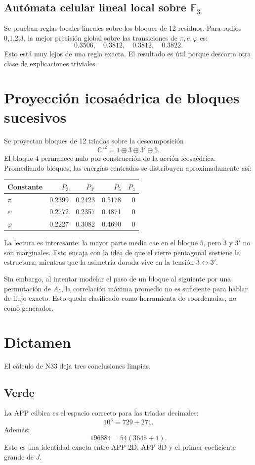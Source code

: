 \documentclass[11pt,a4paper]{article}
\begin{document}
\subsection{Autómata celular lineal local sobre \(\mathbb F_3\)}
Se prueban reglas locales lineales sobre los bloques de 12 residuos. Para radios 0,1,2,3, la mejor precisión global sobre las transiciones de \(\pi,e,\varphi\) es:
\[
0.3506,
\quad
0.3812,
\quad
0.3812,
\quad
0.3822.
\]
Esto está muy lejos de una regla exacta. El resultado es útil porque descarta otra clase de explicaciones triviales.

\section{Proyección icosaédrica de bloques sucesivos}
Se proyectan bloques de 12 triadas sobre la descomposición
\[
\mathbb C^{12}=1\oplus3\oplus3'\oplus5.
\]
El bloque \(4\) permanece nulo por construcción de la acción icosaédrica. Promediando bloques, las energías centradas se distribuyen aproximadamente así:

\begin{longtable}{lrrrr}
\toprule
Constante & \(P_3\) & \(P_{3'}\) & \(P_5\) & \(P_4\)\\
\midrule
\(\pi\) & 0.2399 & 0.2423 & 0.5178 & 0\\
\(e\) & 0.2772 & 0.2357 & 0.4871 & 0\\
\(\varphi\) & 0.2227 & 0.3082 & 0.4690 & 0\\
\bottomrule
\end{longtable}

La lectura es interesante: la mayor parte media cae en el bloque \(5\), pero \(3\) y \(3'\) no son marginales. Esto encaja con la idea de que el cierre pentagonal sostiene la estructura, mientras que la asimetría dorada vive en la tensión \(3\leftrightarrow3'\).

Sin embargo, al intentar modelar el paso de un bloque al siguiente por una permutación de \(A_5\), la correlación máxima promedio no es suficiente para hablar de flujo exacto. Esto queda clasificado como herramienta de coordenadas, no como generador.

\section{Dictamen}
El cálculo de N33 deja tres conclusiones limpias.

\subsection*{Verde}
La APP cúbica es el espacio correcto para las triadas decimales:
\[
10^3=729+271.
\]
Además:
\[
196884=54(3645+1).
\]
Esto es una identidad exacta entre APP 2D, APP 3D y el primer coeficiente grande de \(J\).
\end{document}
